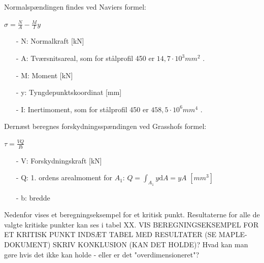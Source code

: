 Normalspændingen findes ved Naviers formel:

\begin{center}
	$\sigma = \frac{N}{A} - \frac{M}{I} y$
\end{center}

\begin{itemize}
	\item[-] N: Normalkraft [kN]
	\item[-] A: Tværsnitsareal, som for stålprofil 450 er $14,\!7 \cdot 10^3 mm^2$ \citep{stabi}. 
	\item[-] M: Moment [kN]
	\item[-] y: Tyngdepunktskoordinat [mm]
	\item[-] I: Inertimoment, som for stålprofil 450 er $458,\!5 \cdot 10^6 mm^4$ \citep{stabi}. 
\end{itemize} 

Dernæst beregnes forskydningsspændingen ved Grasshofs formel:

\begin{center}
	$\tau = \frac{VQ}{Ib}$
\end{center}

\begin{itemize}
	\item[-] V: Forskydningskraft [kN]
	\item[-] Q: 1. ordens arealmoment for $A_1$: $Q = \int_{A_1}y \mathrm{d}A = yA$ $[mm^3]$
	\item[-] b: bredde
\end{itemize}

Nedenfor vises et beregningseksempel for et kritisk punkt. Resultaterne for alle de valgte kritiske punkter kan ses i tabel XX. 
\newline
\newline
VIS BEREGNINGSEKSEMPEL FOR ET KRITISK PUNKT
\newline
\newline
INDSÆT TABEL MED RESULTATER (SE MAPLE-DOKUMENT) 
\newline
\newline
SKRIV KONKLUSION (KAN DET HOLDE)? Hvad kan man gøre hvis det ikke kan holde - eller er det "overdimensioneret"?